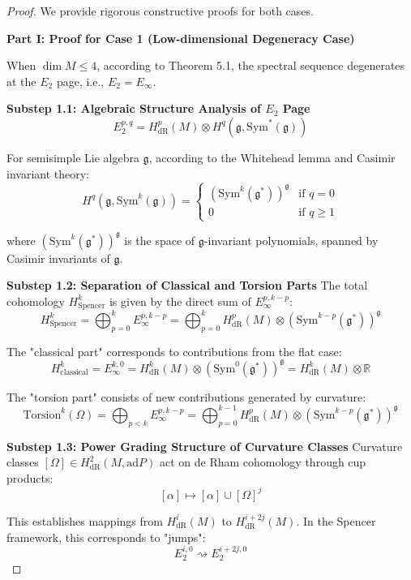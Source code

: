 \documentclass[a4paper,12pt]{extarticle}
\theoremstyle{definition}
\begin{document}
\begin{proof}
We provide rigorous constructive proofs for both cases.

\textbf{Part I: Proof for Case 1 (Low-dimensional Degeneracy Case)}

When $\dim M \leq 4$, according to Theorem 5.1, the spectral sequence degenerates at the $E_2$ page, i.e., $E_2 = E_\infty$.

\textbf{Substep 1.1: Algebraic Structure Analysis of $E_2$ Page}
$$E_2^{p,q} = H^p_{\text{dR}}(M) \otimes H^q(\mathfrak{g}, \text{Sym}^*(\mathfrak{g}))$$

For semisimple Lie algebra $\mathfrak{g}$, according to the Whitehead lemma and Casimir invariant theory:
$$H^q(\mathfrak{g}, \text{Sym}^k(\mathfrak{g})) = \begin{cases} 
(\text{Sym}^k(\mathfrak{g}^*))^\mathfrak{g} & \text{if } q = 0 \\
0 & \text{if } q \geq 1
\end{cases}$$

where $(\text{Sym}^k(\mathfrak{g}^*))^\mathfrak{g}$ is the space of $\mathfrak{g}$-invariant polynomials, spanned by Casimir invariants of $\mathfrak{g}$.

\textbf{Substep 1.2: Separation of Classical and Torsion Parts}
The total cohomology $H^k_{\text{Spencer}}$ is given by the direct sum of $E_\infty^{p,k-p}$:
$$H^k_{\text{Spencer}} = \bigoplus_{p=0}^k E_\infty^{p,k-p} = \bigoplus_{p=0}^k H^p_{\text{dR}}(M) \otimes (\text{Sym}^{k-p}(\mathfrak{g}^*))^\mathfrak{g}$$

The "classical part" corresponds to contributions from the flat case:
$$H^k_{\text{classical}} = E_\infty^{k,0} = H^k_{\text{dR}}(M) \otimes (\text{Sym}^0(\mathfrak{g}^*))^\mathfrak{g} = H^k_{\text{dR}}(M) \otimes \mathbb{R}$$

The "torsion part" consists of new contributions generated by curvature:
$$\text{Torsion}^k(\Omega) = \bigoplus_{p < k} E_\infty^{p,k-p} = \bigoplus_{p=0}^{k-1} H^p_{\text{dR}}(M) \otimes (\text{Sym}^{k-p}(\mathfrak{g}^*))^\mathfrak{g}$$

\textbf{Substep 1.3: Power Grading Structure of Curvature Classes}
Curvature classes $[\Omega] \in H^2_{\text{dR}}(M, \text{ad} P)$ act on de Rham cohomology through cup products:
$$[\alpha] \mapsto [\alpha] \cup [\Omega]^j$$

This establishes mappings from $H^i_{\text{dR}}(M)$ to $H^{i+2j}_{\text{dR}}(M)$. In the Spencer framework, this corresponds to "jumps":
$$E_2^{i,0} \rightsquigarrow E_2^{i+2j,0}$$


\end{proof}
\end{document}
